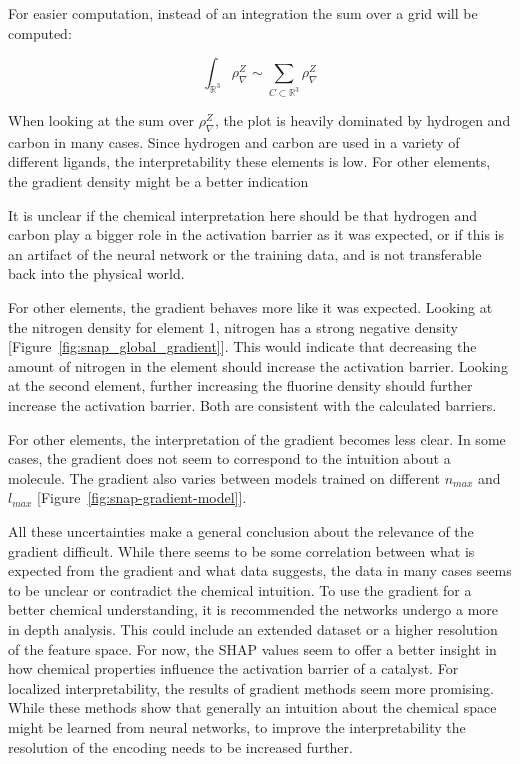 For easier computation, instead of an integration the sum over a grid will be computed: 

$$ \int_{\mathbb{R}^3} \rho_\nabla^Z \sim \sum_{C \subset \mathbb{R}^3} \rho_\nabla^Z $$

When looking at the sum over $\rho^Z_\nabla$, the plot is heavily dominated by hydrogen and carbon
in many cases.
Since hydrogen and carbon are used in a variety of different ligands, the interpretability
these elements is low.
For other elements, the gradient density might be a better indication 



It is unclear if the chemical interpretation here should be that hydrogen and carbon play a bigger role in the activation
barrier as it was expected, or if this is an artifact of the neural network or the training data, and is not transferable back into 
the physical world.

For other elements, the gradient behaves more like it was expected.
Looking at the nitrogen density for element 1, nitrogen has a strong negative density [Figure~\ref{fig:snap_global_gradient}].
This would indicate that decreasing the amount of nitrogen in the element should increase the activation barrier.
Looking at the second element, further increasing the fluorine density should further increase the activation barrier.
Both are consistent with the calculated barriers.


For other elements, the interpretation of the gradient becomes less clear.
In some cases, the gradient does not seem to correspond to the intuition about a molecule.
The gradient also varies between models trained on different $n_{max}$ and $l_{max}$ [Figure~\ref{fig:snap-gradient-model}].

All these uncertainties make a general conclusion about the relevance of the gradient difficult.
While there seems to be some correlation between what is expected from the gradient and what data suggests, 
the data in many cases seems to be unclear or contradict the chemical intuition.
To use the gradient for a better chemical understanding, it is recommended the networks undergo a more in depth analysis.
This could include an extended dataset or a higher resolution of the feature space.
For now, the SHAP values seem to offer a better insight in how chemical properties influence the activation barrier of a catalyst.
For localized interpretability, the results of gradient methods seem more promising.
While these methods show that generally an intuition about the chemical space might be learned from neural networks,
to improve the interpretability the resolution of the encoding needs to be increased further.

